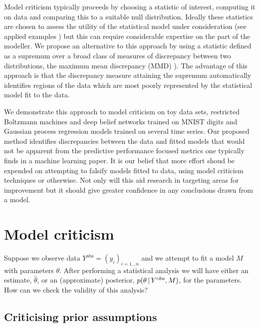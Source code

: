 \documentclass{article} %
\begin{document}
Model criticism typically proceeds by choosing a statistic of interest, computing it on data and comparing this to a suitable null distribution.
Ideally these statistics are chosen to assess the utility of the statistical model under consideration (see applied examples \citep[e.g.][]{Meulders1998-xo}) but this can require considerable expertise on the part of the modeller.
We propose an alternative to this approach by using a statistic defined as a supremum over a broad class of measures of discrepancy between two distributions, the maximum mean discrepancy (MMD) \citep[e.g.][]{Gretton2008-ik}).
The advantage of this approach is that the discrepancy measure attaining the supremum automatically identifies regions of the data which are most poorly represented by the statistical model fit to the data.

We demonstrate this approach to model criticism on toy data sets, restricted Boltzmann machines and deep belief networks trained on MNIST digits and Gaussian process regression models trained on several time series.
Our proposed method identifies discrepancies between the data and fitted models that would not be apparent from the predictive performance focused metrics one typically finds in a machine learning paper.
It is our belief that more effort shoud be expended on attempting to falsify models fitted to data, using model criticism techniques or otherwise.
Not only will this aid research in targeting areas for improvement but it should give greater confidence in any conclusions drawn from a model.

\section{Model criticism}
\label{sec:model-crit-general}

Suppose we observe data $Y^\textrm{obs} = (y_i)_{i=1\ldots n}$ and we attempt to fit a model $M$ with parameters $\theta$.
After performing a statistical analysis we will have either an estimate, $\hat\theta$, or an (approximate) posterior, $p(\theta \,|\, Y^\textrm{obs}, M)$, for the parameters.
How can we check the validity of this analysis?

\subsection{Criticising prior assumptions}
\end{document}
